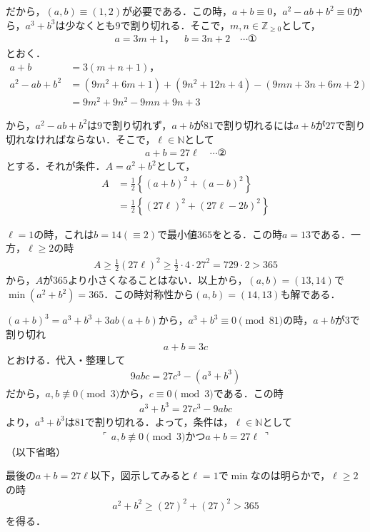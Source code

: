 \documentclass[../main.tex]{subfiles}
\begin{document}
だから，$(a,b)\equiv(1,2)$が必要である．この時，$a+b\equiv0$，$a^2-ab+b^2\equiv0$から，$a^3+b^3$は少なくとも$9$で割り切れる．そこで，$m,n\in\mathbb{Z}_{\ge0}$として，
\begin{align*}
  a=3m+1，\quad b=3n+2\quad\cdots①
\end{align*}
とおく．
\begin{align*}
  a+b&=3(m+n+1)，\\
  a^2-ab+b^2&=(9m^2+6m+1)+(9n^2+12n+4)-(9mn+3n+6m+2)\\
  &=9m^2+9n^2-9mn+9n+3
\end{align*}

から，$a^2-ab+b^2$は$9$で割り切れず，$a+b$が$81$で割り切れるには$a+b$が$27$で割り切れなければならない．そこで，$\ell\in\mathbb{N}$として
\begin{align*}
  a+b=27\ell\quad\cdots②
\end{align*}
とする．それが条件．$A=a^2+b^2$として，
\begin{align*}
  A&=\frac12\left\{(a+b)^2+(a-b)^2\right\}\\
  &=\frac12\left\{(27\ell)^2+(27\ell-2b)^2\right\}
\end{align*}

$\ell=1$の時，これは$b=14(\equiv2)$で最小値$365$をとる．この時$a=13$である．一方，$\ell\ge2$の時
\begin{align*}
  A\ge\frac12(27\ell)^2\ge\frac12\cdot4\cdot27^2=729\cdot2>365
\end{align*}
から，$A$が$365$より小さくなることはない．以上から，$(a,b)=(13,14)$で$\min(a^2+b^2)=365$．この時対称性から$(a,b)=(14,13)$も解である．

\bigskip
\noindent{\bf [解2]}
$(a+b)^3=a^3+b^3+3ab(a+b)$から，$a^3+b^3\equiv0\pmod{81}$の時，$a+b$が$3$で割り切れ
\begin{align*}
  a+b=3c
\end{align*}
とおける．代入・整理して
\begin{align*}
  9abc=27c^3-(a^3+b^3)
\end{align*}
だから，$a,b\not\equiv0\pmod3$から，$c\equiv0\pmod3$である．この時
\begin{align*}
  a^3+b^3=27c^3-9abc
\end{align*}
より，$a^3+b^3$は$81$で割り切れる．よって，条件は，$\ell\in\mathbb{N}$として
\begin{align*}
  \ulcorner\, a,b\not\equiv0\pmod3\text{かつ}a+b=27\ell\,\urcorner
\end{align*}
（以下省略）

\bigskip
\noindent{\bf [注]}
最後の$a+b=27\ell$以下，図示してみると$\ell=1$で$\min$なのは明らかで，$\ell\ge2$の時
\begin{align*}
  a^2+b^2\ge(27)^2+(27)^2>365
\end{align*}
を得る．
\end{document}

